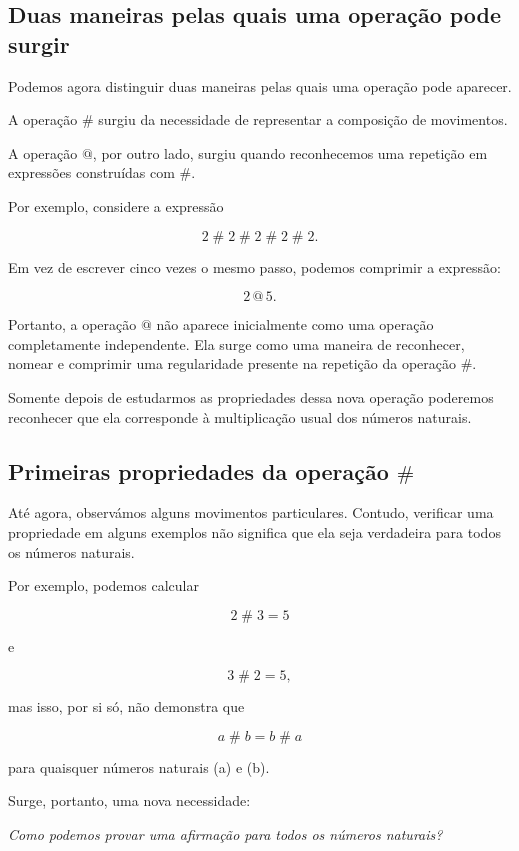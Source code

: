 \documentclass[12pt,a4paper]{article}
\makeatletter
\newcommand{\mov}{\mathbin{\#}}
\newcommand{\rep}{\mathbin{@}}
\makeatother
\begin{document}
\subsection{Duas maneiras pelas quais uma operação pode surgir}

Podemos agora distinguir duas maneiras pelas quais uma operação pode
aparecer.

A operação \(\mov\) surgiu da necessidade de representar a composição
de movimentos.

A operação \(\rep\), por outro lado, surgiu quando reconhecemos uma
repetição em expressões construídas com \(\mov\).

Por exemplo, considere a expressão

\[
    2\mov 2\mov 2\mov 2\mov 2.
\]

Em vez de escrever cinco vezes o mesmo passo, podemos comprimir a
expressão:

\[
    2\rep 5.
\]

Portanto, a operação \(\rep\) não aparece inicialmente como uma
operação completamente independente. Ela surge como uma maneira de
reconhecer, nomear e comprimir uma regularidade presente na repetição
da operação \(\mov\).

Somente depois de estudarmos as propriedades dessa nova operação
poderemos reconhecer que ela corresponde à multiplicação usual dos
números naturais.
\subsection{Primeiras propriedades da operação \texorpdfstring{$\mov$}{\#}}

Até agora, observámos alguns movimentos particulares. Contudo, verificar
uma propriedade em alguns exemplos não significa que ela seja verdadeira
para todos os números naturais.

Por exemplo, podemos calcular

\[
2\mov3=5
\]

e

\[
3\mov2=5,
\]

mas isso, por si só, não demonstra que

\[
a\mov b=b\mov a
\]

para quaisquer números naturais (a) e (b).

Surge, portanto, uma nova necessidade:

\begin{center}
\emph{Como podemos provar uma afirmação para todos os números naturais?}
\end{center}
\end{document}
